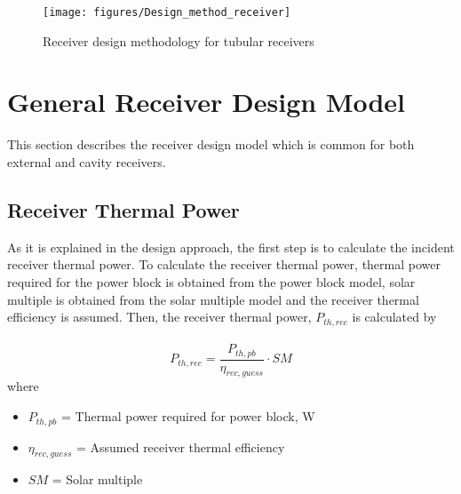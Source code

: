 \begin{figure}[h!]
	\texttt{[image: figures/Design\_method\_receiver]}
	\centering
	\caption{Receiver design methodology for tubular receivers}	
\end{figure}
\section{General Receiver Design Model}
This section describes the receiver design model which is common for both external and cavity receivers.
\subsection{Receiver Thermal Power}
As it is explained in the design approach, the first step is to calculate the incident receiver thermal power. To calculate the receiver thermal power, thermal power required for the power block is obtained from the power block model, solar multiple is obtained from the solar multiple model and the receiver thermal efficiency is assumed. Then, the receiver thermal power, $P_{th,rec}$ is calculated by \\\\
\begin{equation}
	P_{th,rec} = \frac{P_{th,pb}} {\eta_{rec,guess}} \cdot SM
\end{equation}
where
\begin{itemize}
	\item $P_{th,pb}$ = Thermal power required for power block, W
	\item $\eta_{rec,guess}$ = Assumed receiver thermal efficiency
	\item $SM$ = Solar multiple
\end{itemize} 
